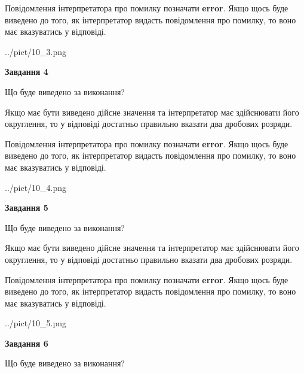 \documentclass[12pt, ukrainian]{article}
\begin{document}
{\begin {Large}
Повідомлення інтерпретатора про помилку позначати \textbf{error}.
Якщо щось буде виведено до того, як інтерпретатор видасть повідомлення про помилку, 
то воно має вказуватись у відповіді. \par

\begin{center}
	{../pict/10_3.png}
\end{center}
\newpage

{\begin {center}\textbf{Завдання 4}\end {center}}\par
Що буде виведено за виконання? \par

Якщо має бути виведено дійсне значення та інтерпретатор має здійснювати його округлення, 
то у відповіді достатньо правильно вказати два дробових розряди.

Повідомлення інтерпретатора про помилку позначати \textbf{error}.
Якщо щось буде виведено до того, як інтерпретатор видасть повідомлення про помилку, 
то воно має вказуватись у відповіді. \par

\begin{center}
	{../pict/10_4.png}
\end{center}
\newpage

{\begin {center}\textbf{Завдання 5}\end {center}}\par
Що буде виведено за виконання? \par

Якщо має бути виведено дійсне значення та інтерпретатор має здійснювати його округлення, 
то у відповіді достатньо правильно вказати два дробових розряди.

Повідомлення інтерпретатора про помилку позначати \textbf{error}.
Якщо щось буде виведено до того, як інтерпретатор видасть повідомлення про помилку, 
то воно має вказуватись у відповіді. \par

\begin{center}
	{../pict/10_5.png}
\end{center}
\newpage

{\begin {center}\textbf{Завдання 6}\end {center}}\par
Що буде виведено за виконання? \par


\end{Large}}
\end{document}
